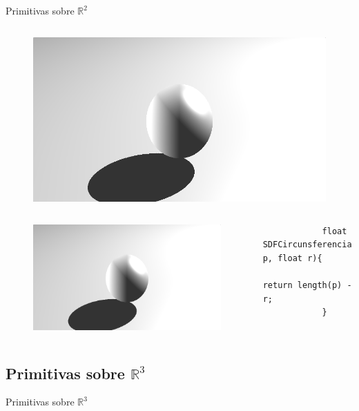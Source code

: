 \begin{frame}[fragile]{Primitivas sobre \(\mathbb{R}^2\)}
\begin{columns}
        \column{1.5in}
            \begin{figure}[H]
              \centering
              \includegraphics[width=1.0\textwidth]{imagenes/lightmodel/sombra_dura.png}
            \end{figure}
        
    \end{columns}
    
    \begin{columns}
        \column{1.5in}
            \begin{figure}[H]
              \centering
              \includegraphics[width=1.0\textwidth]{imagenes/lightmodel/sombra_dura.png}
            \end{figure}
        
        \column{2.5in}
            \begin{lstlisting}
            float SDFCircunsferencia(vec2 p, float r){
                return length(p) - r;
            }
            \end{lstlisting}
        
    \end{columns}

\end{frame}

\subsection{Primitivas sobre \(\mathbb{R}^3\)}
\begin{frame}{Primitivas sobre \(\mathbb{R}^3\)}
\end{frame}
